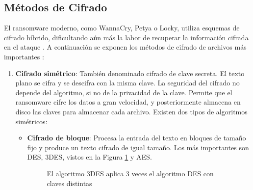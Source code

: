 \subsection{Métodos de Cifrado}
\noindent El ransomware moderno, como WannaCry, Petya o Locky, utiliza esquemas de cifrado híbrido, dificultando aún más la labor de recuperar la información cifrada en el ataque \cite{ransEncr}. A continuación se exponen los métodos de cifrado de archivos más importantes \cite{cypher}:

\begin{enumerate}
    \item \textbf{Cifrado simétrico}: También denominado cifrado de clave secreta. El texto plano se cifra y se descifra con la misma clave. La seguridad del cifrado no depende del algoritmo, si no de la privacidad de la clave. Permite que el ransomware cifre los datos a gran velocidad, y posteriormente almacena en disco las claves para almacenar cada archivo. Existen dos tipos de algoritmos simétricos:
    \begin{itemize}
        \item \textbf{Cifrado de bloque}: Procesa la entrada del texto en bloques de tamaño fijo y produce un texto cifrado de igual tamaño. Los más importantes son \gls{DES}, \gls{3DES}, vistos en la Figura \ref{fig:imdes} y \gls{AES}.
        
        \begin{figure}[htb!]
        \begin{center}
        \caption{El algoritmo 3DES aplica 3 veces el algoritmo DES con claves distintas}
        \label{fig:imdes}
        \end{center}
        \end{figure}
        

\end{itemize}
\end{enumerate}

